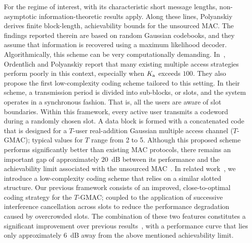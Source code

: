 \documentclass{article}
\begin{document}
For the regime of interest, with its characteristic short message lengths, non-asymptotic information-theoretic results apply.
Along these lines, Polyanskiy~\cite{polyanskiy2017perspective} derives finite block-length, achievability bounds for the unsourced MAC.
The findings reported therein are based on random Gaussian codebooks, and they assume that information is recovered using a maximum likelihood decoder.
Algorithmically, this scheme can be very computationally demanding.
In~\cite{ordentlich2017low}, Ordentlich and Polyanskiy report that many existing multiple access strategies perform poorly in this context, especially when $K_\mathrm{a}$ exceeds $100$.
They also propose the first low-complexity coding scheme tailored to this setting.
In their scheme, a transmission period is divided into sub-blocks, or slots, and the system operates in a synchronous fashion.
That is, all the users are aware of slot boundaries.
Within this framework, every active user transmits a codeword during a randomly chosen slot.
A data block is formed with a concatenated code that is designed for a $T$-user real-addition Gaussian multiple access channel ($T$-GMAC); typical values for $T$ range from 2 to 5.
Although this proposed scheme performs significantly better than existing MAC protocols, there remains an important gap of approximately $20$~dB between its performance and the achievability limit associated with the unsourced MAC~\cite{polyanskiy2017perspective}.
In related work~\cite{vem2017user}, we introduce a low-complexity coding scheme that relies on a similar slotted structure.
Our previous framework consists of an improved, close-to-optimal coding strategy for the $T$-GMAC; coupled to the application of successive interference cancellation across slots to reduce the performance degradation caused by overcrowded slots.
The combination of these two features constitutes a significant improvement over previous results~\cite{ordentlich2017low}, with a performance curve that lies only approximately $6$~dB away from the above mentioned achievability limit.
\end{document}
